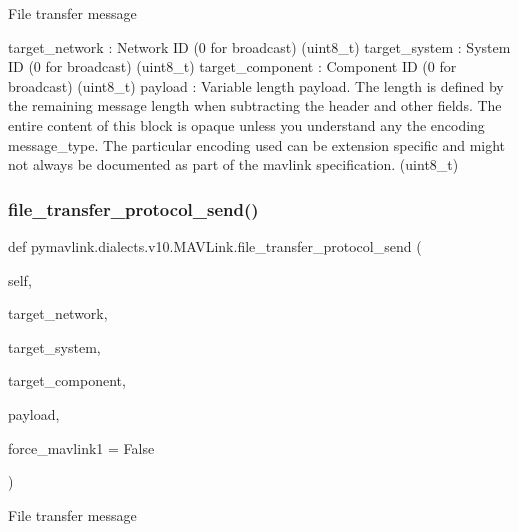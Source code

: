 \begin{DoxyVerb}
\begin{DoxyVerb}
\begin{DoxyVerb}File transfer message

target_network            : Network ID (0 for broadcast) (uint8_t)
target_system             : System ID (0 for broadcast) (uint8_t)
target_component          : Component ID (0 for broadcast) (uint8_t)
payload                   : Variable length payload. The length is defined by the remaining message length when subtracting the header and other fields.  The entire content of this block is opaque unless you understand any the encoding message_type.  The particular encoding used can be extension specific and might not always be documented as part of the mavlink specification. (uint8_t)\end{DoxyVerb}
 \mbox{\label{classpymavlink_1_1dialects_1_1v10_1_1MAVLink_aa07d8bcc43840bafb25b8bc90ef127e5}} 
\subsubsection{\texorpdfstring{file\+\_\+transfer\+\_\+protocol\+\_\+send()}{file\_transfer\_protocol\_send()}}
{\footnotesize\ttfamily def pymavlink.\+dialects.\+v10.\+M\+A\+V\+Link.\+file\+\_\+transfer\+\_\+protocol\+\_\+send (\begin{DoxyParamCaption}\item[{}]{self,  }\item[{}]{target\+\_\+network,  }\item[{}]{target\+\_\+system,  }\item[{}]{target\+\_\+component,  }\item[{}]{payload,  }\item[{}]{force\+\_\+mavlink1 = {\ttfamily False} }\end{DoxyParamCaption})}

\begin{DoxyVerb}File transfer message


\end{DoxyVerb}
\end{DoxyVerb}
\end{DoxyVerb}
